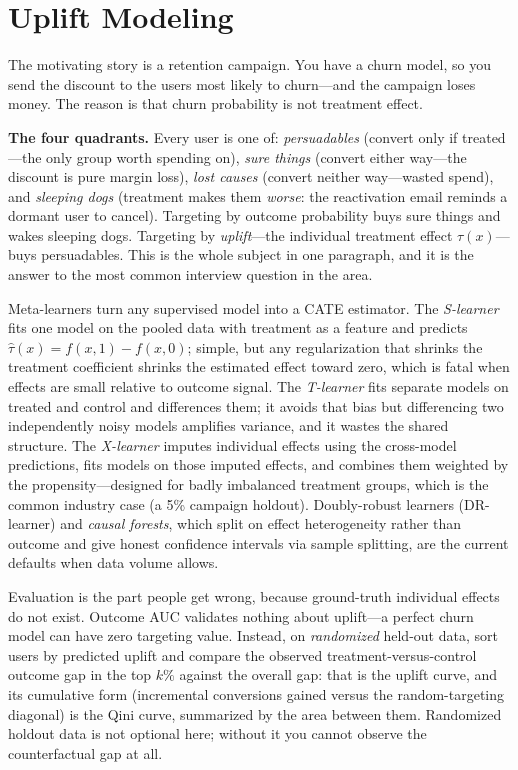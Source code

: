 \section{Uplift Modeling}
\label{cml:sec:uplift}

The motivating story is a retention campaign. You have a churn model, so you send the discount to the users most likely to churn---and the campaign loses money. The reason is that churn probability is not treatment effect.

\begin{keyinsight}
\textbf{The four quadrants.} Every user is one of: \emph{persuadables} (convert only if treated---the only group worth spending on), \emph{sure things} (convert either way---the discount is pure margin loss), \emph{lost causes} (convert neither way---wasted spend), and \emph{sleeping dogs} (treatment makes them \emph{worse}: the reactivation email reminds a dormant user to cancel). Targeting by outcome probability buys sure things and wakes sleeping dogs. Targeting by \emph{uplift}---the individual treatment effect $\tau(x)$---buys persuadables. This is the whole subject in one paragraph, and it is the answer to the most common interview question in the area.
\end{keyinsight}

Meta-learners turn any supervised model into a CATE estimator. The \emph{S-learner} fits one model on the pooled data with treatment as a feature and predicts $\hat\tau(x) = f(x, 1) - f(x, 0)$; simple, but any regularization that shrinks the treatment coefficient shrinks the estimated effect toward zero, which is fatal when effects are small relative to outcome signal. The \emph{T-learner} fits separate models on treated and control and differences them; it avoids that bias but differencing two independently noisy models amplifies variance, and it wastes the shared structure. The \emph{X-learner} imputes individual effects using the cross-model predictions, fits models on those imputed effects, and combines them weighted by the propensity---designed for badly imbalanced treatment groups, which is the common industry case (a 5\% campaign holdout). Doubly-robust learners (DR-learner) and \emph{causal forests}, which split on effect heterogeneity rather than outcome and give honest confidence intervals via sample splitting, are the current defaults when data volume allows.

Evaluation is the part people get wrong, because ground-truth individual effects do not exist. Outcome AUC validates nothing about uplift---a perfect churn model can have zero targeting value. Instead, on \emph{randomized} held-out data, sort users by predicted uplift and compare the observed treatment-versus-control outcome gap in the top $k\%$ against the overall gap: that is the uplift curve, and its cumulative form (incremental conversions gained versus the random-targeting diagonal) is the Qini curve, summarized by the area between them. Randomized holdout data is not optional here; without it you cannot observe the counterfactual gap at all.

